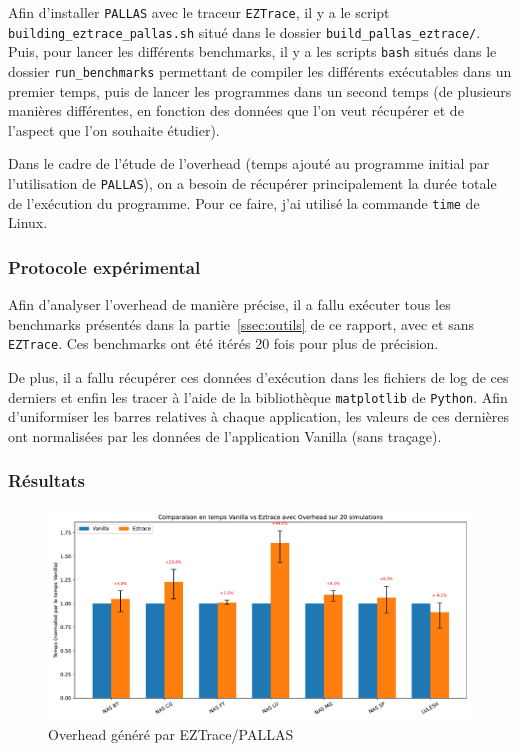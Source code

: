 Afin d'installer \verb!PALLAS! avec le traceur \verb!EZTrace!, il y a le script \verb!building_eztrace_pallas.sh! situé dans le dossier \verb!build_pallas_eztrace/!.
Puis, pour lancer les différents benchmarks, il y a les scripts \verb!bash! situés dans le dossier \verb!run_benchmarks! permettant de compiler les différents
exécutables dans un premier temps, puis de lancer les programmes dans un second temps (de plusieurs manières différentes, en fonction des données que l'on veut récupérer et de l'aspect que l'on souhaite étudier).

Dans le cadre de l'étude de l'overhead (temps ajouté au programme initial par l'utilisation de \verb!PALLAS!), on a besoin de récupérer principalement la durée totale de l'exécution du programme.
Pour ce faire, j'ai utilisé la commande \verb!time! de Linux.

\subsubsection{Protocole expérimental}\label{ssec:overhead_exp}

Afin d'analyser l'overhead de manière précise, il a fallu exécuter tous les benchmarks présentés dans la partie~\ref{ssec:outils} de ce rapport, avec et sans \verb!EZTrace!.
Ces benchmarks ont été itérés 20 fois pour plus de précision.

De plus, il a fallu récupérer ces données d'exécution dans les fichiers de log de ces derniers et enfin les tracer à l'aide de la bibliothèque \verb!matplotlib! de \verb!Python!.
Afin d'uniformiser les barres relatives à chaque application, les valeurs de ces dernières ont normalisées par les données de l'application Vanilla (sans traçage).

\subsubsection{Résultats}\label{ssec:overhead_res}

\begin{figure}[!h]
    \centering
    \includegraphics[width=1\textwidth]{img/overhead.pdf}
    \caption{Overhead généré par EZTrace/PALLAS}
    \label{fig:overhead}
\end{figure}


